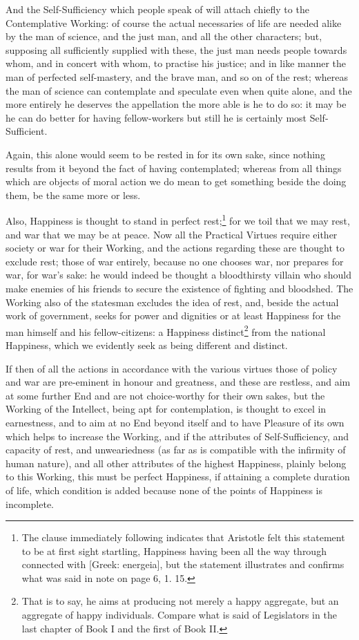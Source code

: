 And the Self-Sufficiency which people speak of will attach chiefly to the
Contemplative Working: of course the actual necessaries of life are needed
alike by the man of science, and the just man, and all the other characters;
but, supposing all sufficiently supplied with these, the just man needs people
towards whom, and in concert with whom, to practise his justice; and in like
manner the man of perfected self-mastery, and the brave man, and so on of the
rest; whereas the man of science can contemplate and speculate even when quite
alone, and the more entirely he deserves the appellation the more able is he to
do so: it may be he can do better for having fellow-workers but still he is
certainly most Self-Sufficient.

Again, this alone would seem to be rested in for its own sake, since nothing
results from it beyond the fact of having contemplated; whereas from all things
which are objects of moral action we do mean to get something beside the doing
them, be the same more or less.

Also, Happiness is thought to stand in perfect
rest;\footnote{The clause immediately following indicates that Aristotle felt this statement
to be at first sight startling, Happiness having been all the way through
connected with [Greek: energeia], but the statement illustrates and confirms
what was said in note on page 6, 1. 15.}
for we toil that we may rest, and war that we may be at peace. Now all the
Practical Virtues require either society or war for their Working, and the
actions regarding these are thought to exclude rest; those of war entirely,
because no one chooses war, nor prepares for war, for war’s sake: he
would indeed be thought a bloodthirsty villain who should make enemies of his
friends to secure the existence of fighting and bloodshed. The Working also of
the statesman excludes the idea of rest, and, beside the actual work of
government, seeks for power and dignities or at least Happiness for the man
himself and his fellow-citizens: a Happiness
distinct\footnote{That is to say, he aims at producing not merely a happy aggregate, but an
aggregate of happy individuals. Compare what is said of Legislators in the last
chapter of Book I and the first of Book II.}
from the national Happiness, which we evidently seek as being different and
distinct.

If then of all the actions in accordance with the various virtues those of
policy and war are pre-eminent in honour and greatness, and these are restless,
and aim at some further End and are not choice-worthy for their own sakes, but
the Working of the Intellect, being apt for contemplation, is thought to excel
in earnestness, and to aim at no End beyond itself and to have Pleasure of its
own which helps to increase the Working, and if the attributes of
Self-Sufficiency, and capacity of rest, and unweariedness (as far as is
compatible with the infirmity of human nature), and all other attributes of the
highest Happiness, plainly belong to this Working, this must be perfect
Happiness, if attaining a complete duration of life, which condition is added
because none of the points of Happiness is incomplete.

